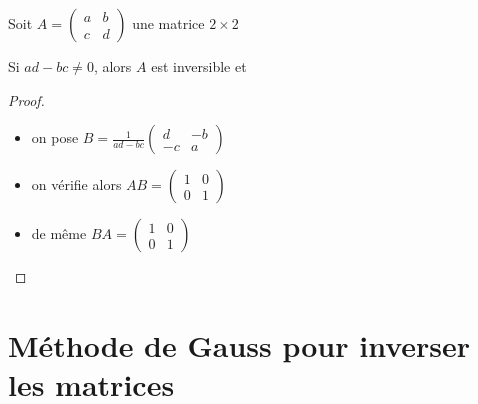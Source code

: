 \begin{frame}
Soit $A = \begin{pmatrix}
 a & b\\
 c & d       
     \end{pmatrix}
$ 
une matrice $2\times 2$

\pause

\begin{proposition}
Si $ad - bc \not= 0$,  alors $A$ est inversible et
\end{proposition}

\pause

\begin{proof}
\begin{itemize}
\item on pose $B=\frac{1}{ad-bc}  \left(\begin{smallmatrix}
d & -b\\
 -c & a
\end{smallmatrix}\right)$
\item\pause on vérifie alors $AB = \left(\begin{smallmatrix}
 1 & 0\\
 0 & 1
 \end{smallmatrix}\right)$
\item\pause de même $BA=\left(\begin{smallmatrix}
 1 & 0\\
 0 & 1
 \end{smallmatrix}\right)$ \qedhere
\end{itemize}
\end{proof}
\end{frame}


\section{Méthode de Gauss pour inverser les matrices}
 
